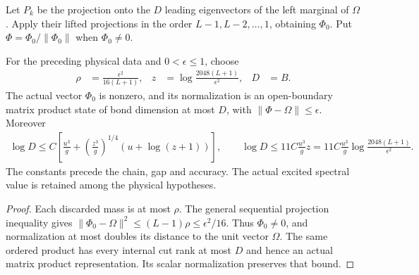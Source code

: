 \begin{definition}
    \label{def:aklv_sequential_spectral_approximant}
    \leanok
    Let $P_k$ be the projection onto the $D$ leading eigenvectors of
    the left marginal of $\Omega$. Apply their lifted projections in
    the order $L-1,L-2,\ldots,1$, obtaining $\Phi_0$.
    Put $\Phi=\Phi_0/\|\Phi_0\|$ when $\Phi_0\ne0$.
\end{definition}

\begin{theorem}
    \label{thm:aklv_sharp_sequential_mps}
    \leanok
    For the preceding physical data and $0<\epsilon\le1$, choose
    \begin{align*}
        \rho & =\frac{\epsilon^2}{16(L+1)},       &
        z    & =\log\frac{2048(L+1)}{\epsilon^2}, & D & =B.
    \end{align*}
    The actual vector $\Phi_0$ is nonzero, and its normalization is an
    open-boundary matrix product state of bond dimension at most $D$,
    with $\|\Phi-\Omega\|\le\epsilon$. Moreover
    \begin{align*}
        \log D\le C\left[\frac{u^3}{g}+
            \left(\frac{z^3}{g}\right)^{1/4}(u+\log(z+1))\right],
        \qquad
        \log D\le 11C\frac{u^3}{g}z
        =11C\frac{u^3}{g}\log\frac{2048(L+1)}{\epsilon^2}.
    \end{align*}
    The constants precede the chain, gap and accuracy. The actual
    excited spectral value is retained among the physical hypotheses.
\end{theorem}
\begin{proof}
    \leanok
    Each discarded mass is at most $\rho$. The general sequential
    projection inequality gives
    $\|\Phi_0-\Omega\|^2\le(L-1)\rho\le\epsilon^2/16$.
    Thus $\Phi_0\ne0$, and normalization at most doubles its distance
    to the unit vector $\Omega$. The same ordered product has every
    internal cut rank at most $D$ and hence an actual matrix product
    representation. Its scalar normalization preserves that bound.
\end{proof}

